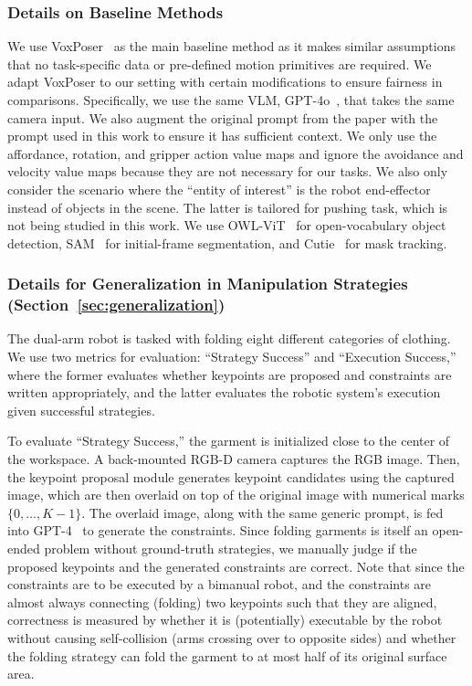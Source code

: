 \subsubsection{Details on Baseline Methods}
We use VoxPoser~\cite{huang2023voxposer} as the main baseline method as it makes similar assumptions that no task-specific data or pre-defined motion primitives are required.
We adapt VoxPoser to our setting with certain modifications to ensure fairness in comparisons. Specifically, we use the same VLM, GPT-4o~\cite{openai2023gpt}, that takes the same camera input. We also augment the original prompt from the paper with the prompt used in this work to ensure it has sufficient context.
We only use the affordance, rotation, and gripper action value maps and ignore the avoidance and velocity value maps because they are not necessary for our tasks.
We also only consider the scenario where the ``entity of interest'' is the robot end-effector instead of objects in the scene. The latter is tailored for pushing task, which is not being studied in this work.
We use OWL-ViT~\cite{minderer2022simple} for open-vocabulary object detection, SAM~\cite{kirillov2023segment} for initial-frame segmentation, and Cutie~\cite{cheng2023putting} for mask tracking.

\subsubsection{Details for Generalization in Manipulation Strategies (Section~\ref{sec:generalization})}
The dual-arm robot is tasked with folding eight different categories of clothing. We use two metrics for evaluation: ``Strategy Success'' and ``Execution Success,'' where the former evaluates whether keypoints are proposed and constraints are written appropriately, and the latter evaluates the robotic system's execution given successful strategies.

To evaluate ``Strategy Success,'' the garment is initialized close to the center of the workspace. A back-mounted RGB-D camera captures the RGB image. Then, the keypoint proposal module generates keypoint candidates using the captured image, which are then overlaid on top of the original image with numerical marks $\{0, \ldots, K-1\}$. The overlaid image, along with the same generic prompt, is fed into GPT-4~\cite{openai2023gpt} to generate the \algabrvname constraints. Since folding garments is itself an open-ended problem without ground-truth strategies, we manually judge if the proposed keypoints and the generated constraints are correct. Note that since the constraints are to be executed by a bimanual robot, and the constraints are almost always connecting (folding) two keypoints such that they are aligned, correctness is measured by whether it is (potentially) executable by the robot without causing self-collision (arms crossing over to opposite sides) and whether the folding strategy can fold the garment to at most half of its original surface area.

